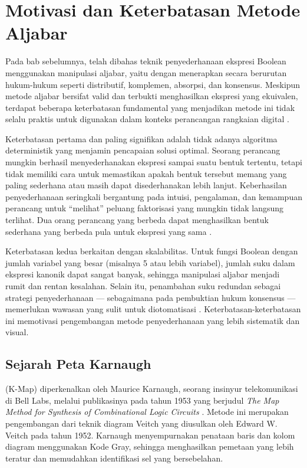 \section{Motivasi dan Keterbatasan Metode Aljabar}

Pada bab sebelumnya, telah dibahas teknik penyederhanaan ekspresi Boolean menggunakan manipulasi aljabar, yaitu dengan menerapkan secara berurutan hukum-hukum seperti distributif, komplemen, absorpsi, dan konsensus. Meskipun metode aljabar bersifat valid dan terbukti menghasilkan ekspresi yang ekuivalen, terdapat beberapa keterbatasan fundamental yang menjadikan metode ini tidak selalu praktis untuk digunakan dalam konteks perancangan rangkaian digital \cite{rosen2019}.

Keterbatasan pertama dan paling signifikan adalah tidak adanya algoritma deterministik yang menjamin pencapaian solusi optimal. Seorang perancang mungkin berhasil menyederhanakan ekspresi sampai suatu bentuk tertentu, tetapi tidak memiliki cara untuk memastikan apakah bentuk tersebut memang yang paling sederhana atau masih dapat disederhanakan lebih lanjut. Keberhasilan penyederhanaan seringkali bergantung pada intuisi, pengalaman, dan kemampuan perancang untuk ``melihat'' peluang faktorisasi yang mungkin tidak langsung terlihat. Dua orang perancang yang berbeda dapat menghasilkan bentuk sederhana yang berbeda pula untuk ekspresi yang sama \cite{allaboutcircuits_boolean}.

Keterbatasan kedua berkaitan dengan skalabilitas. Untuk fungsi Boolean dengan jumlah variabel yang besar (misalnya 5 atau lebih variabel), jumlah suku dalam ekspresi kanonik dapat sangat banyak, sehingga manipulasi aljabar menjadi rumit dan rentan kesalahan. Selain itu, penambahan suku redundan sebagai strategi penyederhanaan --- sebagaimana pada pembuktian hukum konsensus --- memerlukan wawasan yang sulit untuk diotomatisasi \cite{mit_6042}. Keterbatasan-keterbatasan ini memotivasi pengembangan metode penyederhanaan yang lebih sistematik dan visual.

\subsection{Sejarah Peta Karnaugh}

 (K-Map) diperkenalkan oleh Maurice Karnaugh, seorang insinyur telekomunikasi di Bell Labs, melalui publikasinya pada tahun 1953 yang berjudul \textit{The Map Method for Synthesis of Combinational Logic Circuits} \cite{karnaugh1953}. Metode ini merupakan pengembangan dari teknik diagram Veitch yang diusulkan oleh Edward W. Veitch pada tahun 1952. Karnaugh menyempurnakan penataan baris dan kolom diagram menggunakan Kode Gray, sehingga menghasilkan pemetaan yang lebih teratur dan memudahkan identifikasi sel yang bersebelahan.

